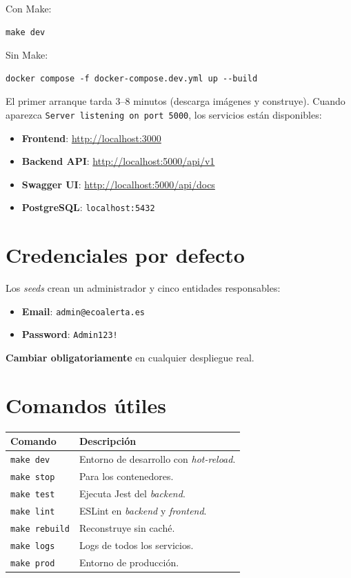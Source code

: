 Con Make:
\begin{verbatim}
make dev
\end{verbatim}

Sin Make:
\begin{verbatim}
docker compose -f docker-compose.dev.yml up --build
\end{verbatim}

El primer arranque tarda 3--8 minutos (descarga imágenes y construye). Cuando aparezca \texttt{Server listening on port 5000}, los servicios están disponibles:

\begin{itemize}
  \item \textbf{Frontend}: \url{http://localhost:3000}
  \item \textbf{Backend API}: \url{http://localhost:5000/api/v1}
  \item \textbf{Swagger UI}: \url{http://localhost:5000/api/docs}
  \item \textbf{PostgreSQL}: \texttt{localhost:5432}
\end{itemize}


\section*{Credenciales por defecto}

Los \textit{seeds} crean un administrador y cinco entidades responsables:

\begin{itemize}
  \item \textbf{Email}: \texttt{admin@ecoalerta.es}
  \item \textbf{Password}: \texttt{Admin123!}
\end{itemize}

\textbf{Cambiar obligatoriamente} en cualquier despliegue real.


\section*{Comandos útiles}

\begin{table}[H]
\centering
\small
\begin{tabular}{@{}L{4cm}L{8cm}@{}}
\toprule
\textbf{Comando} & \textbf{Descripción} \\
\midrule
\texttt{make dev}      & Entorno de desarrollo con \textit{hot-reload}. \\
\texttt{make stop}     & Para los contenedores. \\
\texttt{make test}     & Ejecuta Jest del \textit{backend}. \\
\texttt{make lint}     & ESLint en \textit{backend} y \textit{frontend}. \\
\texttt{make rebuild}  & Reconstruye sin caché. \\
\texttt{make logs}     & Logs de todos los servicios. \\
\texttt{make prod}     & Entorno de producción. \\
\bottomrule
\end{tabular}
\end{table}


